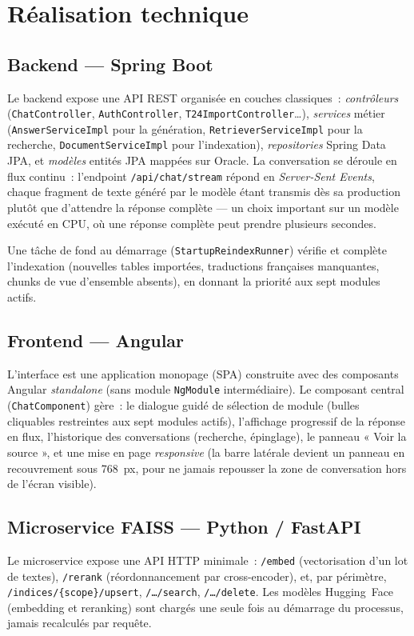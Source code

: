 ﻿\documentclass[12pt,a4paper]{report}
\newcommand{\code}[1]{\texttt{\color{biatbluedk}#1}}
\begin{document}
\chapter{Réalisation technique}
\label{ch:realisation}

\section{Backend --- Spring Boot}
Le backend expose une API REST organisée en couches classiques~: \emph{contrôleurs} (\code{ChatController}, \code{AuthController}, \code{T24ImportController}\dots), \emph{services} métier (\code{AnswerServiceImpl} pour la génération, \code{RetrieverServiceImpl} pour la recherche, \code{DocumentServiceImpl} pour l'indexation), \emph{repositories} Spring Data JPA, et \emph{modèles} entités JPA mappées sur Oracle. La conversation se déroule en flux continu~: l'endpoint \code{/api/chat/stream} répond en \emph{Server-Sent Events}, chaque fragment de texte généré par le modèle étant transmis dès sa production plutôt que d'attendre la réponse complète --- un choix important sur un modèle exécuté en CPU, où une réponse complète peut prendre plusieurs secondes.

Une tâche de fond au démarrage (\code{StartupReindexRunner}) vérifie et complète l'indexation (nouvelles tables importées, traductions françaises manquantes, chunks de vue d'ensemble absents), en donnant la priorité aux sept modules actifs.

\section{Frontend --- Angular}
L'interface est une application monopage (SPA) construite avec des composants Angular \emph{standalone} (sans module \code{NgModule} intermédiaire). Le composant central (\code{ChatComponent}) gère~: le dialogue guidé de sélection de module (bulles cliquables restreintes aux sept modules actifs), l'affichage progressif de la réponse en flux, l'historique des conversations (recherche, épinglage), le panneau « Voir la source », et une mise en page \emph{responsive} (la barre latérale devient un panneau en recouvrement sous 768~px, pour ne jamais repousser la zone de conversation hors de l'écran visible).

\section{Microservice FAISS --- Python / FastAPI}
Le microservice expose une API HTTP minimale~: \code{/embed} (vectorisation d'un lot de textes), \code{/rerank} (réordonnancement par cross-encoder), et, par périmètre, \code{/indices/\{scope\}/upsert}, \code{/\dots/search}, \code{/\dots/delete}. Les modèles Hugging~Face (embedding et reranking) sont chargés une seule fois au démarrage du processus, jamais recalculés par requête.
\end{document}
